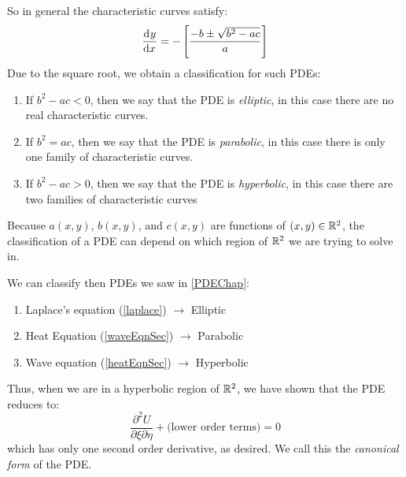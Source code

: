 \documentclass[../main.tex]{subfiles}
\begin{document}
So in general the characteristic curves satisfy:
\[
  \deriv{y}{x} = -\left[\frac{-b \pm \sqrt{b^2 - ac}}{a}\right]
\]
Due to the square root, we obtain a classification for such PDEs:
\begin{enumerate}
  \item If $b^2 - ac < 0$, then we say that the PDE is \textit{elliptic}, in this case there are no real characteristic curves.
  \item If $b^2 = ac$, then we say that the PDE is \textit{parabolic}, in this case there is only one family of characteristic curves.
  \item If $b^2 - ac > 0$, then we say that the PDE is \textit{hyperbolic}, in this case there are two families of characteristic curves
\end{enumerate}
\begin{remark}[Note]
  Because $a(x, y)$, $b(x, y)$, and $c(x, y)$ are functions of $(x, y) \in \mathbb{R}^{2}$, the classification of a PDE can depend on which region of $\mathbb{R}^2$ we are trying to solve in.
\end{remark}
\begin{example}
  We can classify then PDEs we saw in \cref{PDEChap}:
  \begin{enumerate}
    \item Laplace's equation (\cref{laplace}) $\to$ Elliptic
    \item Heat Equation (\cref{waveEqnSec}) $\to$ Parabolic
    \item Wave equation (\cref{heatEqnSec}) $\to$ Hyperbolic
  \end{enumerate}
\end{example}
Thus, when we are in a hyperbolic region of $\mathbb{R}^2$, we have shown that the PDE reduces to:
\[
  \frac{\partial^2 U}{\partial \xi \partial \eta} + \text{(lower order terms)} = 0
\]
which has only one second order derivative, as desired.
We call this the \textit{canonical form} of the PDE.
\end{document}
